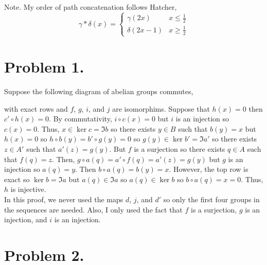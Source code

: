 \documentclass[12pt]{extarticle}
\begin{document}

Note. My order of path concatenation follows Hatcher,
\[\gamma * \delta(x) = \begin{cases}
\gamma(2x) & x \le \tfrac{1}{2} \\
\delta(2x - 1) & x \ge \tfrac{1}{2}
\end{cases}\]
 
\section*{Problem 1.}

Suppose the following diagram of abelian groups commutes,
\begin{center}
\end{center}  
with exact rows and $f$, $g$, $i$, and $j$ are isomorphims. Suppose that $h(x) = 0$ then $c' \circ h(x) = 0$. By commutativity, $i \circ c(x) = 0$ but $i$ is an injection so $c(x) = 0$. Thus, $x \in \ker{c} = \Im{b}$ so there exists $y \in B$ such that $b(y) = x$ but $h(x) = 0$ so $h \circ b(y) = b' \circ g (y) = 0$ so $g(y) \in \ker{b'} = \Im{a'}$ so there exists $z \in A'$ such that $a'(z) = g(y)$. But $f$ is a surjection so there exists $q \in A$ such that $f(q) = z$. Then, $g \circ a(q) = a' \circ f(q) = a'(z) = g(y)$ but $g$ is an injection so $a(q) = y$. Then $b \circ a(q) = b(y) = x$. However, the top row is exact so $\ker{b} = \Im{a}$ but $a(q) \in \Im{a}$ so $a(q) \in \ker{b}$ so $b \circ a(q) = x = 0$. Thus, $h$ is injective. \bigskip\\
In this proof, we never used the maps $d$, $j$, and $d'$ so only the first four groups in the sequences are needed. Also, I only used the fact that $f$ is a surjection, $g$ is an injection, and $i$ is an injection.
  
\section*{Problem 2.}
\end{document}
